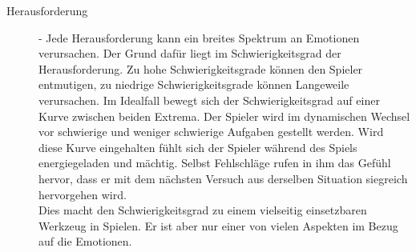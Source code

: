 \begin{description}
\item[Herausforderung] - 
Jede Herausforderung kann ein breites Spektrum an Emotionen verursachen. Der Grund dafür liegt im Schwierigkeitsgrad der Herausforderung. Zu hohe Schwierigkeitsgrade können den Spieler entmutigen, zu niedrige Schwierigkeitsgrade können Langeweile verursachen. Im Idealfall bewegt sich der Schwierigkeitsgrad auf einer Kurve zwischen beiden Extrema. Der Spieler wird im dynamischen Wechsel vor schwierige und weniger schwierige Aufgaben gestellt werden. 
Wird diese Kurve eingehalten fühlt sich der Spieler während des Spiels energiegeladen und mächtig. Selbst Fehlschläge rufen in ihm das Gefühl hervor, dass er mit dem  nächsten Versuch aus derselben Situation siegreich hervorgehen wird. \cite[S. 22]{Adams:1515529}\\
Dies macht den Schwierigkeitsgrad zu einem vielseitig einsetzbaren Werkzeug in Spielen. Er ist aber nur einer von vielen Aspekten im Bezug auf die Emotionen. \cite[S. 22]{Adams:1515529}





\end{description}
